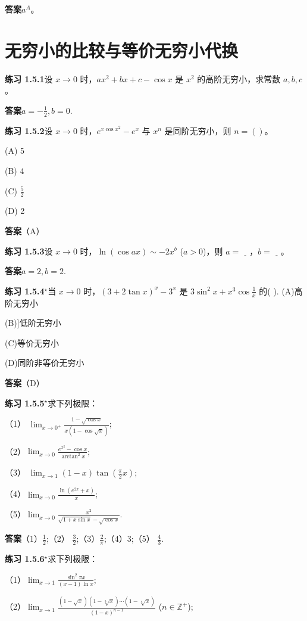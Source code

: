 \documentclass[lang=cn,10pt]{elegantbook}
\begin{document}
\textbf{答案}$a^A$。
\section{无穷小的比较与等价无穷小代换}
\textbf{练习 1.5.1}设 $x \rightarrow 0$ 时，$ax^2 + bx + c - \cos x$ 是 $x^2$ 的高阶无穷小，求常数 $a, b, c$。

\textbf{答案}$a = -\frac{1}{2}, b = 0$.


\textbf{练习 1.5.2}设 $x \rightarrow 0$ 时，$e^{x\cos x^2} - e^x$ 与 $x^n$ 是同阶无穷小，则 $n = ()$。

(A) 5

(B) 4

(C) $\frac{5}{2}$

(D) 2

\textbf{答案}（A）


\textbf{练习 1.5.3}设 $x \rightarrow 0$ 时，$\ln(\cos ax) \sim -2x^b$ ($a > 0$)，则 $a = \underline{\quad}$，$b = \underline{\quad}$。

\textbf{答案}$a = 2, b = 2$.


\textbf{练习 1.5.4}${ }^{\star}$当 $x \rightarrow 0$ 时，$(3 + 2\tan x)^x - 3^x$ 是 $3\sin^2 x + x^3 \cos \frac{1}{x}$ 的(  ).
(A)高阶无穷小

(B)]低阶无穷小

(C)等价无穷小

(D)同阶非等价无穷小

\textbf{答案}（D）


\textbf{练习 1.5.5}${ }^{\star}$求下列极限：

（1） $\lim_{x\rightarrow 0^+} \frac{1-\sqrt{\cos x}}{x(1-\cos\sqrt{x})}$;

（2）$\lim_{x\rightarrow 0} \frac{e^{x^2}-\cos x}{\arctan^2 x}$;

（3） $\lim_{x\rightarrow 1} (1-x)\tan\left(\frac{\pi}{2}x\right)$;

（4）$\lim_{x\rightarrow 0} \frac{\ln(e^{2x}+x)}{x}$;

（5）$\lim_{x\rightarrow 0} \frac{x^2}{\sqrt{1+x\sin x}-\sqrt{\cos x}}$.

\textbf{答案}（1）$\frac{1}{2}$;（2） $\frac{3}{2}$;（3）$\frac{2}{\pi}$;（4）$3$;（5） $\frac{4}{3}$.


\textbf{练习 1.5.6}${ }^{\star}$求下列极限：

（1）$\lim_{x\rightarrow 1} \frac{\sin^2 \pi x}{(x-1)\ln x}$;

（2）$\lim_{x\rightarrow 1} \frac{(1-\sqrt{x})(1-\sqrt[3]{x})\cdots(1-\sqrt[n]{x})}{(1-x)^{n-1}}$ ($n \in \mathbb{Z}^+$);
\end{document}
